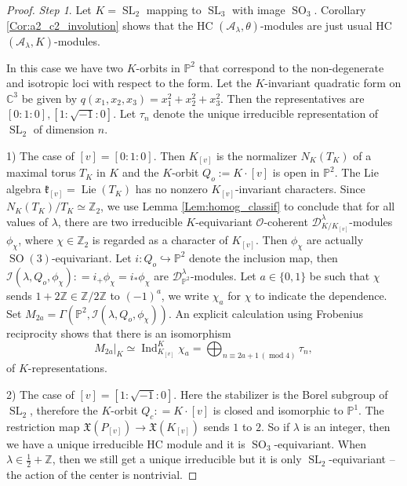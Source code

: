 \documentclass[12pt]{amsart}
\newcommand{\C}{\mathbb{C}}
\newcommand{\A}{\mathcal{A}}
\newcommand{\I}{\mathcal{I}}
\newcommand{\Z}{\mathbb{Z}}
\newcommand{\kf}{\mathfrak{k}}
\newcommand{\Pb}{\mathbb{P}}
\newcommand{\SL}{\operatorname{SL}}
\newcommand{\SO}{\operatorname{SO}}
\theoremstyle{definition}
\numberwithin{equation}{section}
\begin{document}
\begin{proof}
{\it Step 1}.
Let $K=\operatorname{SL}_2$ mapping to $\operatorname{SL}_3$ with image $\operatorname{SO}_3$.
Corollary \ref{Cor:a2_c2_involution} shows that the HC $(\A_\lambda,\theta)$-modules are
just usual HC $(\A_\lambda,K)$-modules.

In this case we have two $K$-orbits in $\mathbb{P}^2$ that correspond to the non-degenerate and
isotropic loci with respect to the form. Let  the $K$-invariant quadratic form
on $\C^3$ be given by $q(x_1,x_2,x_3)=x_1^2+x_2^2+x_3^2$.  Then the representatives
are $[0:1:0],[1:\sqrt{-1}:0]$. Let $\tau_n$ denote the unique irreducible representation of $\SL_2$ of dimension $n$.

1) The case of $[v]=[0:1:0]$. Then $K_{[v]}$ is  the normalizer $N_K(T_K)$ of a maximal torus $T_K$ in $K$ and the $K$-orbit $Q_o := K \cdot [v]$ is open in $\Pb^2$. The Lie algebra $\kf_{[v]} = \operatorname{Lie}(T_K)$ has no nonzero
$K_{[v]}$-invariant characters. Since $N_K(T_K) / T_K \simeq \Z_2$, we use Lemma \ref{Lem:homog_classif} to conclude that for all values of $\lambda$, there are two irreducible $K$-equivariant $\mathcal{O}$-coherent
$\mathscr{D}^\lambda_{K/K_{[v]}}$-modules $\phi_\chi$, where $\chi \in  \Z_2$ is regarded as a character of $K_{[v]}$. Then $\phi_\chi$ are actually $\SO(3)$-equivariant. Let $i: Q_o \hookrightarrow \Pb^2$ denote the inclusion map, then $\I(\lambda, Q_o, \phi_\chi): = i_+ \phi_\chi = i_* \phi_\chi$ are $\mathscr{D}^\lambda_{\Pb^2}$-modules. Let $a\in \{0,1\}$ be such that $\chi$ sends $1+2\Z \in \Z/2\Z$ to $(-1)^a$,
we write $\chi_a$ for $\chi$ to indicate the dependence. Set $M_{2a} = \Gamma(\Pb^2, \I(\lambda, Q_o, \phi_\chi))$. An explicit calculation using Frobenius reciprocity shows that there is an isomorphism
  \begin{equation}\label{eq:K_Q_open}
  	 M_{2a} \big|_K \simeq \operatorname{Ind}_{K_{[v]}}^K \chi_a = \bigoplus_{n \equiv 2a+1 \, (\operatorname{mod} 4)} \tau_n,
\end{equation}
of $K$-representations.

2) The case of $[v]=[1:\sqrt{-1}:0]$. Here the stabilizer is the Borel subgroup of
$\operatorname{SL}_2$,  therefore the $K$-orbit $Q_c: = K \cdot [v]$ is closed and isomorphic to $\Pb^1$. The restriction map $\mathfrak{X}(P_{[v]})
\rightarrow \mathfrak{X}(K_{[v]})$ sends $1$ to $2$. So if $\lambda$
is an integer, then we have a unique irreducible HC module and it is $\operatorname{SO}_3$-equivariant.
When $\lambda\in \frac{1}{2}+\Z$, then we still get a unique irreducible but it is only
$\operatorname{SL}_2$-equivariant -- the action of the center is nontrivial.


\end{proof}
\end{document}
